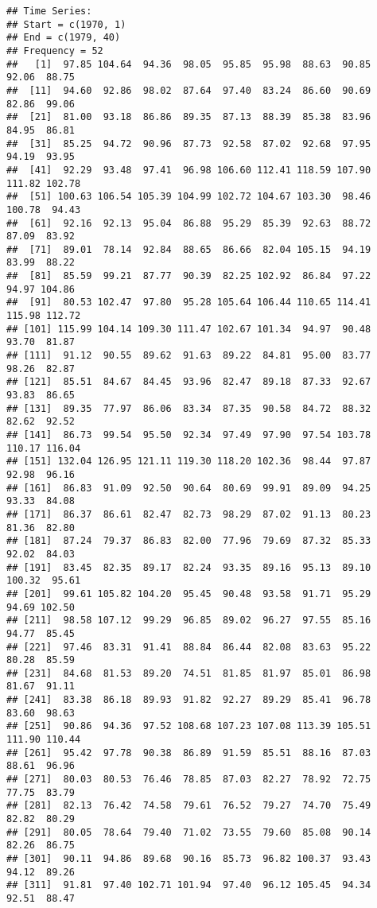 \documentclass[
]{article}
\begin{document}
\begin{verbatim}
## Time Series:
## Start = c(1970, 1) 
## End = c(1979, 40) 
## Frequency = 52 
##   [1]  97.85 104.64  94.36  98.05  95.85  95.98  88.63  90.85  92.06  88.75
##  [11]  94.60  92.86  98.02  87.64  97.40  83.24  86.60  90.69  82.86  99.06
##  [21]  81.00  93.18  86.86  89.35  87.13  88.39  85.38  83.96  84.95  86.81
##  [31]  85.25  94.72  90.96  87.73  92.58  87.02  92.68  97.95  94.19  93.95
##  [41]  92.29  93.48  97.41  96.98 106.60 112.41 118.59 107.90 111.82 102.78
##  [51] 100.63 106.54 105.39 104.99 102.72 104.67 103.30  98.46 100.78  94.43
##  [61]  92.16  92.13  95.04  86.88  95.29  85.39  92.63  88.72  87.09  83.92
##  [71]  89.01  78.14  92.84  88.65  86.66  82.04 105.15  94.19  83.99  88.22
##  [81]  85.59  99.21  87.77  90.39  82.25 102.92  86.84  97.22  94.97 104.86
##  [91]  80.53 102.47  97.80  95.28 105.64 106.44 110.65 114.41 115.98 112.72
## [101] 115.99 104.14 109.30 111.47 102.67 101.34  94.97  90.48  93.70  81.87
## [111]  91.12  90.55  89.62  91.63  89.22  84.81  95.00  83.77  98.26  82.87
## [121]  85.51  84.67  84.45  93.96  82.47  89.18  87.33  92.67  93.83  86.65
## [131]  89.35  77.97  86.06  83.34  87.35  90.58  84.72  88.32  82.62  92.52
## [141]  86.73  99.54  95.50  92.34  97.49  97.90  97.54 103.78 110.17 116.04
## [151] 132.04 126.95 121.11 119.30 118.20 102.36  98.44  97.87  92.98  96.16
## [161]  86.83  91.09  92.50  90.64  80.69  99.91  89.09  94.25  93.33  84.08
## [171]  86.37  86.61  82.47  82.73  98.29  87.02  91.13  80.23  81.36  82.80
## [181]  87.24  79.37  86.83  82.00  77.96  79.69  87.32  85.33  92.02  84.03
## [191]  83.45  82.35  89.17  82.24  93.35  89.16  95.13  89.10 100.32  95.61
## [201]  99.61 105.82 104.20  95.45  90.48  93.58  91.71  95.29  94.69 102.50
## [211]  98.58 107.12  99.29  96.85  89.02  96.27  97.55  85.16  94.77  85.45
## [221]  97.46  83.31  91.41  88.84  86.44  82.08  83.63  95.22  80.28  85.59
## [231]  84.68  81.53  89.20  74.51  81.85  81.97  85.01  86.98  81.67  91.11
## [241]  83.38  86.18  89.93  91.82  92.27  89.29  85.41  96.78  83.60  98.63
## [251]  90.86  94.36  97.52 108.68 107.23 107.08 113.39 105.51 111.90 110.44
## [261]  95.42  97.78  90.38  86.89  91.59  85.51  88.16  87.03  88.61  96.96
## [271]  80.03  80.53  76.46  78.85  87.03  82.27  78.92  72.75  77.75  83.79
## [281]  82.13  76.42  74.58  79.61  76.52  79.27  74.70  75.49  82.82  80.29
## [291]  80.05  78.64  79.40  71.02  73.55  79.60  85.08  90.14  82.26  86.75
## [301]  90.11  94.86  89.68  90.16  85.73  96.82 100.37  93.43  94.12  89.26
## [311]  91.81  97.40 102.71 101.94  97.40  96.12 105.45  94.34  92.51  88.47

\end{verbatim}
\end{document}
